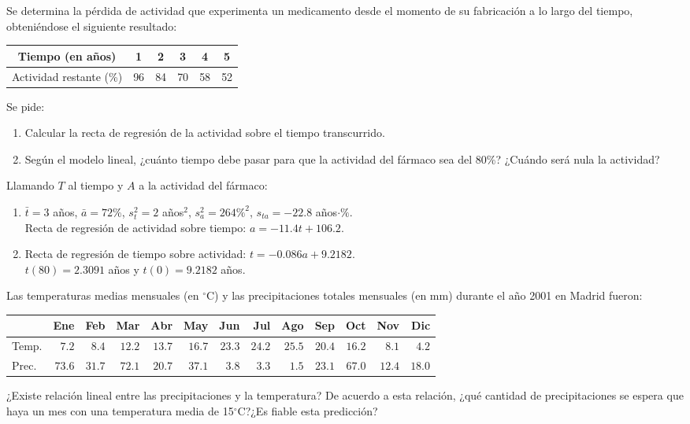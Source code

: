{Se determina la pérdida de actividad que experimenta un medicamento desde el momento de su fabricación a lo largo del
tiempo, obteniéndose el siguiente resultado: 

\begin{center}
\begin{tabular}{|c|c|c|c|c|c|}
\hline
Tiempo (en años) & 1 & 2 & 3 & 4 & 5 \\ \hline
Actividad restante (\%) & 96 & 84 & 70 & 58 & 52 \\ \hline
\end{tabular}
\end{center}

Se pide:
\begin{enumerate}
\item Calcular la recta de regresión de la actividad sobre el tiempo transcurrido.
\item Según el modelo lineal, ¿cuánto tiempo debe pasar para que la actividad del fármaco sea del 80\%? 
¿Cuándo será nula la actividad?
\end{enumerate}
}
{Llamando $T$ al tiempo y $A$ a la actividad del fármaco:
\begin{enumerate}
\item $\bar t=3$ años, $\bar a=72\%$, $s_t^2=2$ años$^2$, $s_a^2=264\%^2$, $s_{ta}=-22.8$ años$\cdot\%$.\\
Recta de regresión de actividad sobre tiempo: $a=-11.4t+106.2$.
\item Recta de regresión de tiempo sobre actividad: $t=-0.086a+9.2182$.\\
$t(80)=2.3091$ años y $t(0)=9.2182$ años.
\end{enumerate}
}
{}


{Las temperaturas medias mensuales (en $^\circ$C) y las precipitaciones totales mensuales (en mm) durante el año 2001 en Madrid fueron:
\begin{center}
\begin{tabular}{|l|r|r|r|r|r|r|r|r|r|r|r|r|}
\cline{2-13}
\multicolumn{1}{c|}{} &    Ene &    Feb &    Mar &    Abr &    May &    Jun &    Jul &    Ago &    Sep &    Oct &    Nov &    Dic \\
\hline
Temp.               &  $7.2$ &  $8.4$ & $12.2$ & $13.7$ & $16.7$ & $23.3$ & $24.2$ & $25.5$ & $20.4$ & $16.2$ &  $8.1$ &  $4.2$ \\
\hline
Prec.                & $73.6$ & $31.7$ & $72.1$ & $20.7$ & $37.1$ & $3.8$ & $3.3$ & $1.5$ & $23.1$ & $67.0$ & $12.4$ & $18.0$ \\
\hline
\end{tabular}
\end{center}
¿Existe relación lineal entre las precipitaciones y la temperatura?
De acuerdo a esta relación, ¿qué cantidad de precipitaciones se espera que haya un mes con una temperatura media de 15$^\circ$C?¿Es fiable esta predicción?
}
{}
{}


